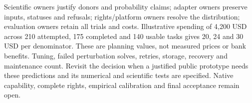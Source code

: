 Scientific owners justify donors and probability claims; adapter owners
preserve inputs, statuses and refusals; rights/platform owners resolve
the distribution; evaluation owners retain all trials and costs.
Illustrative spending of 4,200 USD across 210 attempted, 175 completed
and 140 usable tasks gives 20, 24 and 30 USD per denominator. These are
planning values, not measured prices or bank benefits. Tuning, failed
perturbation solves, retries, storage, recovery and maintenance count.
Revisit the decision when a justified public prototype needs these
predictions and its numerical and scientific tests are specified.
Native capability, complete rights, empirical calibration and final
acceptance remain open.~\citep{exec24_scpi_choice}
